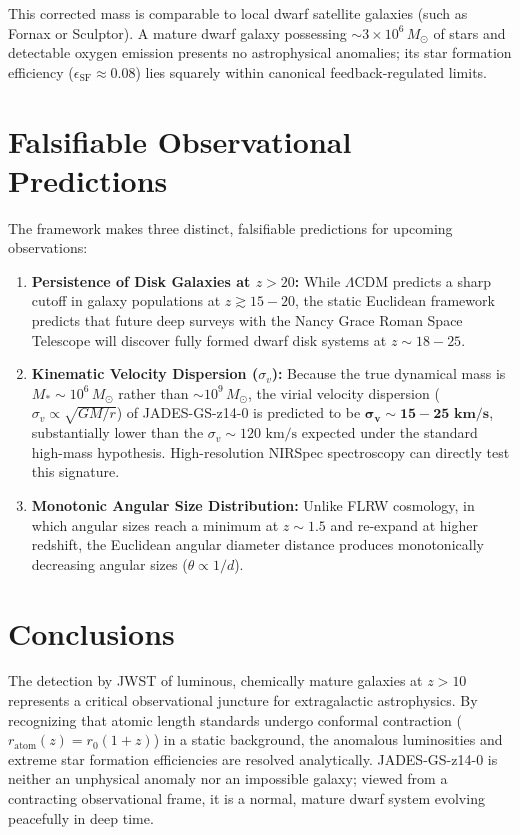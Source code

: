 \documentclass[11pt,a4paper]{article}
\begin{document}
This corrected mass is comparable to local dwarf satellite galaxies (such as Fornax or Sculptor). A mature dwarf galaxy possessing $\sim 3 \times 10^6\,M_\odot$ of stars and detectable oxygen emission presents no astrophysical anomalies; its star formation efficiency ($\epsilon_{\mathrm{SF}} \approx 0.08$) lies squarely within canonical feedback-regulated limits.

\section{Falsifiable Observational Predictions}
\label{sec:predictions}

The framework makes three distinct, falsifiable predictions for upcoming observations:
\begin{enumerate}
    \item \textbf{Persistence of Disk Galaxies at $z > 20$:} While $\Lambda$CDM predicts a sharp cutoff in galaxy populations at $z \gtrsim 15-20$, the static Euclidean framework predicts that future deep surveys with the Nancy Grace Roman Space Telescope will discover fully formed dwarf disk systems at $z \sim 18-25$.
    \item \textbf{Kinematic Velocity Dispersion ($\sigma_v$):} Because the true dynamical mass is $M_* \sim 10^6\,M_\odot$ rather than $\sim 10^9\,M_\odot$, the virial velocity dispersion ($\sigma_v \propto \sqrt{GM/r}$) of JADES-GS-z14-0 is predicted to be $\mathbf{\sigma_v \sim 15-25\text{ km/s}}$, substantially lower than the $\sigma_v \sim 120\text{ km/s}$ expected under the standard high-mass hypothesis. High-resolution NIRSpec spectroscopy can directly test this signature.
    \item \textbf{Monotonic Angular Size Distribution:} Unlike FLRW cosmology, in which angular sizes reach a minimum at $z \sim 1.5$ and re-expand at higher redshift, the Euclidean angular diameter distance produces monotonically decreasing angular sizes ($\theta \propto 1/d$).
\end{enumerate}

\section{Conclusions}
\label{sec:conclusions}

The detection by JWST of luminous, chemically mature galaxies at $z > 10$ represents a critical observational juncture for extragalactic astrophysics. By recognizing that atomic length standards undergo conformal contraction ($r_{\mathrm{atom}}(z) = r_0 (1+z)$) in a static background, the anomalous luminosities and extreme star formation efficiencies are resolved analytically. JADES-GS-z14-0 is neither an unphysical anomaly nor an impossible galaxy; viewed from a contracting observational frame, it is a normal, mature dwarf system evolving peacefully in deep time.
\end{document}
